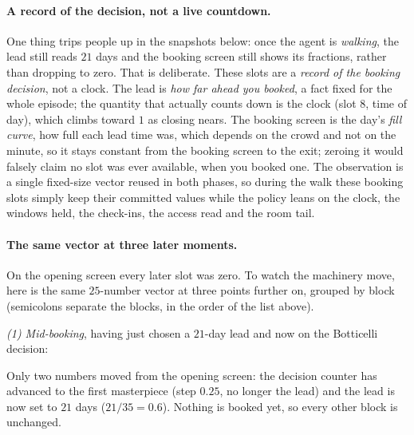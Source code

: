 \documentclass[11pt]{article}
\begin{document}
\paragraph{A record of the decision, not a live countdown.} One thing trips people up in the snapshots
below: once the agent is \emph{walking}, the lead still reads $21$ days and the booking screen still
shows its fractions, rather than dropping to zero. That is deliberate. These slots are a \emph{record of
the booking decision}, not a clock. The lead is \emph{how far ahead you booked}, a fact fixed for the
whole episode; the quantity that actually counts down is the clock (slot 8, time of day), which climbs
toward $1$ as closing nears. The booking screen is the day's \emph{fill curve}, how full each lead time
was, which depends on the crowd and not on the minute, so it stays constant from the booking screen to
the exit; zeroing it would falsely claim no slot was ever available, when you booked one. The
observation is a single fixed-size vector reused in both phases, so during the walk these booking slots
simply keep their committed values while the policy leans on the clock, the windows held, the check-ins,
the access read and the room tail.

\paragraph{The same vector at three later moments.} On the opening screen every later slot was zero.
To watch the machinery move, here is the same $25$-number vector at three points further on, grouped by
block (semicolons separate the blocks, in the order of the list above).

\emph{(1) Mid-booking}, having just chosen a $21$-day lead and now on the Botticelli decision:
\begin{center}\footnotesize\ttfamily
[1, 0.25, 0.6; 0.12, 0.38, 0.62, 1; 0; 0,0,0; 0,0,0; 0,0,0,0; 0.23,0.57,0.66; 0,0.22,0.05,0.99]
\end{center}
Only two numbers moved from the opening screen: the decision counter has advanced to the first
masterpiece (step $0.25$, no longer the lead) and the lead is now set to $21$ days ($21/35=0.6$).
Nothing is booked yet, so every other block is unchanged.
\end{document}
